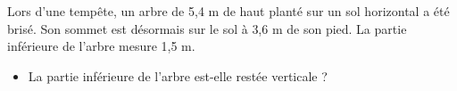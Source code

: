 \documentclass[exercice]{thedocument}%
\begin{document}
%
\begin{flushleft}
    Lors d'une tempête, un arbre de \textsf{5,4 m} de haut planté sur un sol
    horizontal a été brisé. Son sommet est désormais sur le sol à \textsf{3,6
    m} de son pied. La partie inférieure de l'arbre mesure \textsf{1,5 m}.
\end{flushleft}
\begin{center}
\end{center}
\begin{itemize}
    \item La partie inférieure de l'arbre est-elle restée verticale ?
\end{itemize}
\end{document}
